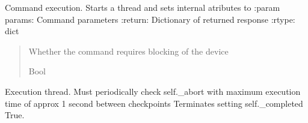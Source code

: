 \documentclass[letterpaper,10pt,english]{sphinxmanual}
\begin{document}
\begin{fulllineitems}
\begin{fulllineitems}
\label{\detokenize{webserverdocs:HardwareThreadedClass.ThreadedHardwareCommand.do}}
\pysigstartsignatures
{}
\pysigstopsignatures
\sphinxAtStartPar
Command execution.
Starts a thread and sets internal atributes to
:param params: Command parameters
:return: Dictionary of returned response
:rtype: dict

\end{fulllineitems}


\begin{fulllineitems}
\label{\detokenize{webserverdocs:HardwareThreadedClass.ThreadedHardwareCommand.is_blocking}}
\pysigstartsignatures
{}
\pysigstopsignatures\begin{quote}\begin{description}
\sphinxAtStartPar
Whether the command requires blocking of the device

\sphinxAtStartPar
Bool

\end{description}\end{quote}

\end{fulllineitems}


\begin{fulllineitems}
\label{\detokenize{webserverdocs:HardwareThreadedClass.ThreadedHardwareCommand.thread}}
\pysigstartsignatures
{}
\pysigstopsignatures
\sphinxAtStartPar
Execution thread. Must periodically check self.\_abort
with maximum execution time of approx 1 second between checkpoints
Terminates setting self.\_completed True.

\end{fulllineitems}


\end{fulllineitems}
\end{document}
